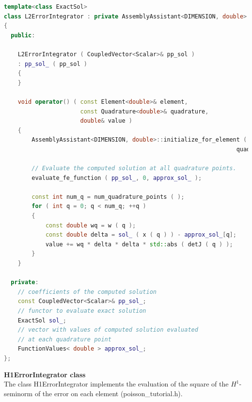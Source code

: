 \documentclass[a4paper, 11pt, twoside]{article}
\begin{document}
\begin{lstlisting}[language=C++, basicstyle={\footnotesize, \ttfamily}, keywordstyle=\color{blue}, numbers=none, tabsize=4]
template<class ExactSol>
class L2ErrorIntegrator : private AssemblyAssistant<DIMENSION, double>
{
  public:

    L2ErrorIntegrator ( CoupledVector<Scalar>& pp_sol )
    : pp_sol_ ( pp_sol )
    {
    }

    void operator() ( const Element<double>& element, 
                      const Quadrature<double>& quadrature,
                      double& value )
    {
        AssemblyAssistant<DIMENSION, double>::initialize_for_element ( element, 
                                                                   quadrature );

        // Evaluate the computed solution at all quadrature points.
        evaluate_fe_function ( pp_sol_, 0, approx_sol_ );

        const int num_q = num_quadrature_points ( );
        for ( int q = 0; q < num_q; ++q )
        {
            const double wq = w ( q );
            const double delta = sol_ ( x ( q ) ) - approx_sol_[q];
            value += wq * delta * delta * std::abs ( detJ ( q ) );
        }
    }

  private:
    // coefficients of the computed solution
    const CoupledVector<Scalar>& pp_sol_;
    // functor to evaluate exact solution
    ExactSol sol_;
    // vector with values of computed solution evaluated
    // at each quadrature point
    FunctionValues< double > approx_sol_;
};
\end{lstlisting}

\textbf{H1ErrorIntegrator class}\\
The class H1ErrorIntegrator implements the evaluation of the square of the $H^1$-seminorm of the error on each element (poisson\_tutorial.h).
\end{document}
